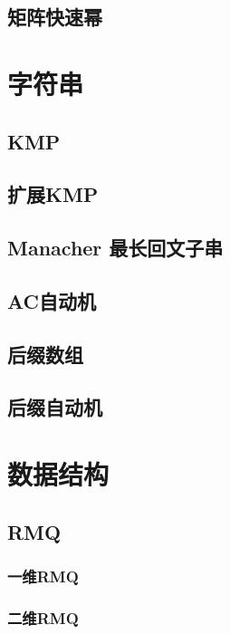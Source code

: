 \documentclass[twocolumn,a4]{article}%
\begin{document}
\subsection{矩阵快速幂}
    
    
\section{字符串}
\subsection{KMP}

\subsection{扩展KMP}

\subsection{Manacher 最长回文子串}

\subsection{AC自动机}

\subsection{后缀数组}

\subsection{后缀自动机}

\section{数据结构}
\subsection{RMQ}
    \subsubsection{一维RMQ}
    
    \subsubsection{二维RMQ}
    
\end{document}
